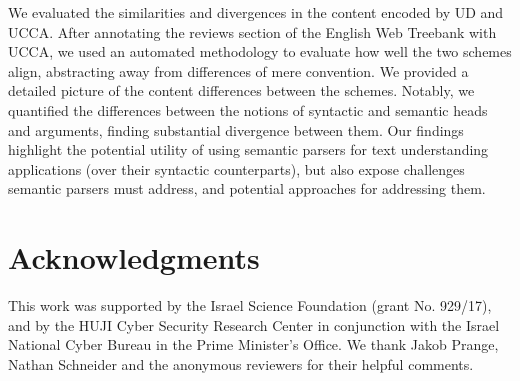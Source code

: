 \documentclass[11pt,a4paper,table]{article}
\begin{document}
We evaluated the similarities and divergences in the content encoded by UD and UCCA. 
After annotating the reviews section of the English Web Treebank with UCCA,
  we used an automated methodology to evaluate how well the two schemes align,
  abstracting away from differences of mere convention.
We provided a detailed picture of the content differences between the schemes.
Notably, we quantified the differences between the notions of syntactic and semantic heads
  and arguments, finding substantial divergence between them.
Our findings highlight the potential utility of using semantic parsers for text understanding applications
  (over their syntactic counterparts), but also expose challenges semantic parsers must address,
  and potential approaches for addressing them.

\section*{Acknowledgments}

This work was supported by the Israel Science Foundation (grant No. 929/17),
and by the HUJI Cyber Security Research Center
in conjunction with the Israel National Cyber Bureau in the Prime Minister's Office.
We thank Jakob Prange, Nathan Schneider
and the anonymous reviewers for their helpful comments.




\end{document}

